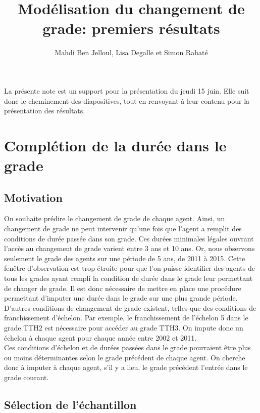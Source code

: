 \documentclass[11pt,a4paper]{article}
\begin{document}
\title{Modélisation du changement de grade: premiers résultats}


\author{Mahdi Ben Jelloul, Lisa Degalle et Simon Rabat\'e}


\maketitle


La présente note est un support pour la présentation du jeudi 15 juin. Elle suit donc le cheminement des diapositives, tout en renvoyant à leur contenu pour la présentation des résultats. 


\section{Complétion de la durée dans le grade}
\subsection{Motivation}

On souhaite prédire le changement de grade de chaque agent. Ainsi, un changement de grade ne peut intervenir qu'une fois que l'agent a remplit des conditions de durée passée dans son grade. Ces durées minimales légales ouvrant l'accès au changement de grade varient entre 3 ans et 10 ans. Or, nous observons seulement le grade des agents sur une période de 5 ans, de 2011 à 2015. Cette fenêtre d'observation est trop étroite pour que l'on puisse identifier des agents de tous les grades ayant rempli la condition de durée dans le grade leur permettant de changer de grade. Il est donc nécessaire de mettre en place une procédure permettant d'imputer une durée dans le grade sur une plus grande période.\\
\indent D'autres conditions de changement de grade existent, telles que des conditions de franchissement d'échelon. Par exemple, le franchissement de l'échelon 5 dans le grade TTH2 est nécessaire pour accéder au grade TTH3. On impute donc un échelon à chaque agent pour chaque année entre 2002 et 2011.\\
\indent Ces conditions d'échelon et de durées passées dans le grade pourraient être plus ou moins déterminantes selon le grade précédent de chaque agent. On cherche donc à imputer à chaque agent, s'il y a lieu, le grade précédent l'entrée dans le grade courant.

\subsection{Sélection de l'échantillon}
\end{document}
